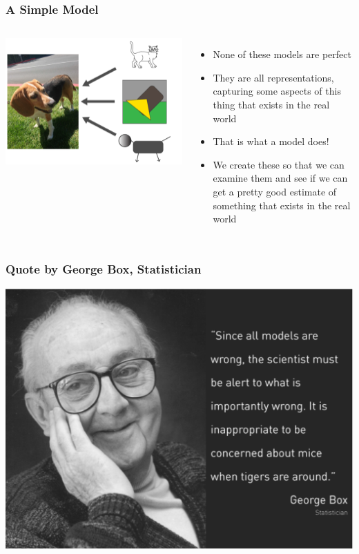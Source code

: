 \documentclass[12pt, block=fill]{beamer}
\begin{document}
\begin{frame}
  \frametitle{A Simple Model}
  \begin{columns}
      \includegraphics[width=1.0\linewidth]{figures/model_c.png}  
      
      \begin{itemize}
      \item None of these models are perfect
      \item They are all representations, capturing some aspects of this thing that exists in the real world
      \item That is what a model does!
      \item We create these so that we can examine them and see if we can get a pretty good estimate of something that exists in the real world
  \end{itemize}
  \end{columns}

\end{frame}

\begin{frame}
  \frametitle{Quote by George Box, Statistician}
  \begin{center}
    \includegraphics[width=0.9\linewidth]{figures/george_box_quote_a.png}     
  \end{center}
\end{frame}
\end{document}
